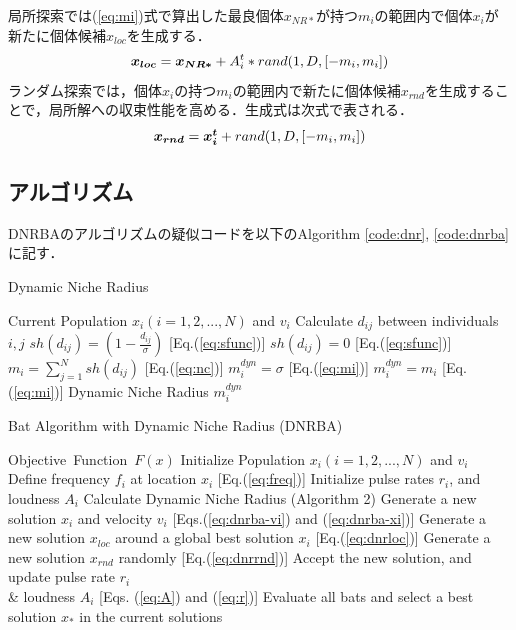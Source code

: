 \documentclass[a4j,11pt]{jarticle}
\begin{document}
局所探索では(\ref{eq:mi})式で算出した最良個体$x_{NR*}$が持つ$m_i$の範囲内で個体$x_i$が新たに個体候補$x_{loc}$を生成する．
\begin{equation}
\label{eq:dnrloc}
\mbox{\boldmath $x_{loc}$}=\mbox{\boldmath $x_{NR*}$} + A_i^t*rand(1,D,[-m_i, m_i])
\end{equation}
ランダム探索では，個体$x_i$の持つ$m_i$の範囲内で新たに個体候補$x_{rnd}$を生成することで，局所解への収束性能を高める．生成式は次式で表される．
\begin{equation}
\label{eq:dnrrnd}
\mbox{\boldmath $x_{rnd}$}=\mbox{\boldmath $x_i^t$} + rand(1,D,[-m_i, m_i])
\end{equation}

\subsection{アルゴリズム}
\label{sss:DNRBA-algorithm}
DNRBAのアルゴリズムの疑似コードを以下のAlgorithm \ref{code:dnr}, \ref{code:dnrba}に記す．
\begin{algorithm}[h]
\caption{Dynamic Niche Radius}
\label{code:dnr}
\begin{algorithmic}[2]
\REQUIRE Current Population $x_i(i=1,2,..., N)$ and $v_i$
\STATE Calculate $d_{ij}$ between individuals $i,j$
\STATE $sh(d_{ij}) =  (1-\frac{d_{ij}}{\sigma})$ [Eq.(\ref{eq:sfunc})]
\ELSE
\STATE $sh(d_{ij}) =  0 $ [Eq.(\ref{eq:sfunc})]
\ENDIF
\ENDFOR
\STATE $m_i=\sum_{j=1}^N sh(d_{ij})$ [Eq.(\ref{eq:nc})]
\ENDFOR
{}
\STATE $m_i^{dyn}=\sigma$ [Eq.(\ref{eq:mi})]
\ELSE 
\STATE $m_i^{dyn} = m_i$ [Eq.(\ref{eq:mi})]
\ENDIF
\ENDFOR
\RETURN Dynamic Niche Radius $m_i^{dyn}$
\end{algorithmic}
\end{algorithm}

\begin{algorithm}[h]
\caption{Bat Algorithm with Dynamic Niche Radius (DNRBA)}
\label{code:dnrba}
\begin{algorithmic}[3]
\REQUIRE Objective\ Function\ $F(x)$
\STATE Initialize Population $x_i(i=1,2,..., N)$ and $v_i$\\
\STATE Define frequency $f_i$ at location $x_i$ [Eq.(\ref{eq:freq})]
\STATE Initialize pulse rates $r_i$, and loudness $A_i$
\STATE Calculate Dynamic Niche Radius (Algorithm 2)
\STATE Generate a new solution $x_i$ and velocity $v_i$ [Eqs.(\ref{eq:dnrba-vi}) and (\ref{eq:dnrba-xi})]
\STATE Generate a new solution $x_{loc}$ around a global best solution $x_i$ [Eq.(\ref{eq:dnrloc})] 
\ENDIF
\STATE Generate a new solution $x_{rnd}$ randomly [Eq.(\ref{eq:dnrrnd})]
\STATE Accept the new solution, and update pulse rate $r_i$ \\ \& loudness $A_i$ [Eqs. (\ref{eq:A}) and (\ref{eq:r})]  
\ENDIF
\STATE Evaluate all bats and select a best solution $x_*$ in the current solutions
\ENDFOR
\ENDWHILE
\end{algorithmic}
\end{algorithm}
\end{document}
